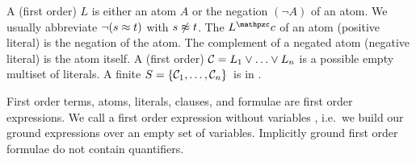 
\begin{definition}[\CNF]
A (first order)  \( L \) is either an atom \( A \) or the negation
\( (\lnot A) \) of an atom. We usually abbreviate \( \lnot(s\approx t) \) with \( s\not\approx t \).
%
The  \( L^\mcc \) of an atom (positive literal) is the negation of the atom.
The complement of a negated atom (negative literal) is the atom itself.
A (first order)  \( \mathcal{C} = L_1\lor\ldots\lor L_n \)  is a possible empty multiset of literals.
A finite  \( S=\{ \mathcal{C}_1,\ldots,\mathcal{C}_n \} \) is in .
\end{definition}

\begin{remark}
	First order terms, atoms, literals, clauses, and formulae are first order expressions.
	We call a first order expression without variables ,
	i.e.~we build our ground expressions over an empty set of variables.
	Implicitly ground first order formulae do not contain quantifiers.
\end{remark}



